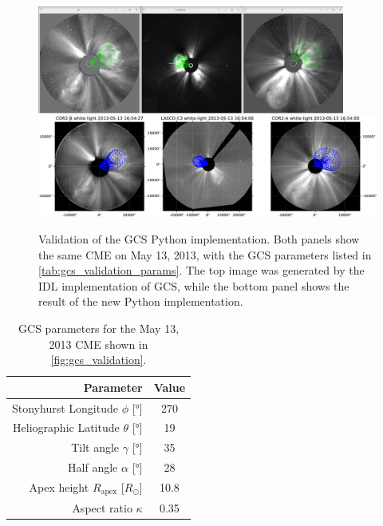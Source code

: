 \begin{figure}
	\centering
	\includegraphics[width=0.9\textwidth]{images/gcs_validation_20130513_idl.png}\\[5mm]
	\includegraphics[width=\textwidth]{images/gcs_validation_20130513_python.pdf}
	\caption[Validation of the GCS Python implementation]{Validation of the GCS Python implementation. Both panels show the same CME on May 13, 2013, with the GCS parameters listed in \autoref{tab:gcs_validation_params}. The top image was generated by the IDL implementation of GCS, while the bottom panel shows the result of the new Python implementation.}
	\label{fig:gcs_validation}
\end{figure}

\begin{table}
	\centering
	\begin{tabular}{rS[table-format=3.2]}
		\toprule
		                                  {Parameter} & {Value} \\ \midrule
		   Stonyhurst Longitude $\phi$ [\si{\degree}] & 270     \\
		Heliographic Latitude $\theta$ [\si{\degree}] & 19      \\
		           Tilt angle $\gamma$ [\si{\degree}] & 35      \\
		           Half angle $\alpha$ [\si{\degree}] & 28      \\
		      Apex height $R_\text{apex}$ [$R_\odot$] & 10.8    \\
		                        Aspect ratio $\kappa$ & 0.35    \\ \bottomrule
	\end{tabular}
	\caption[GCS parameters for \autoref{fig:gcs_validation}]{GCS parameters for the May 13, 2013 CME shown in \autoref{fig:gcs_validation}.}
	\label{tab:gcs_validation_params}
\end{table}

